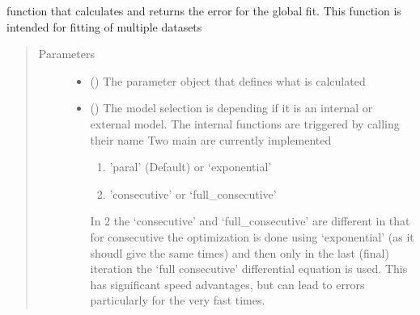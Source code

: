 \documentclass[letterpaper,10pt,english]{sphinxmanual}
\begin{document}
\begin{fulllineitems}
\label{\detokenize{plot_func:plot_func.err_func_multi}}
function that calculates and returns the error for the global fit. This function is intended for
fitting of multiple datasets
\begin{quote}\begin{description}
\item[{Parameters}] \leavevmode\begin{itemize}
\item {} 
 () \textendash{} The parameter object that defines what is calculated

\item {} 
 (\sphinxstyleliteralemphasis{\sphinxupquote{, }}) \textendash{} 
The model selection is depending if it is an internal or external model.
The internal functions are triggered by calling their name
Two main are currently implemented
\begin{enumerate}
%
\item {} 
’paral’ (Default) or ‘exponential’

\item {} 
’consecutive’ or ‘full\_consecutive’

\end{enumerate}

In 2 the ‘consecutive’ and ‘full\_consecutive’ are different in that for consecutive
the optimization is done using ‘exponential’ (as it shoudl give the same times)
and then only in the last (final) iteration the ‘full consecutive’ differential
equation is used. This has significant speed advantages, but can lead to errors particularly
for the very fast times.


\end{itemize}
\end{description}
\end{quote}
\end{fulllineitems}
\end{document}
